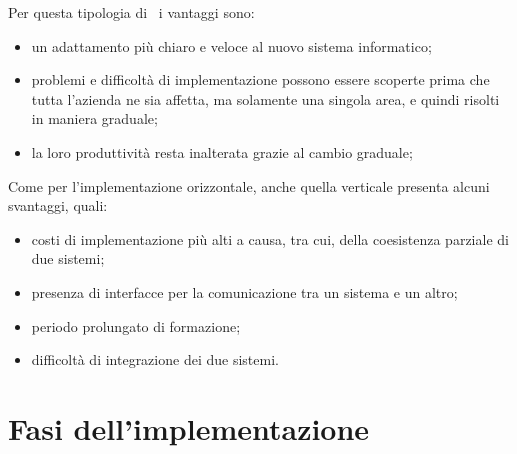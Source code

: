 	Per questa tipologia di \rollout~i vantaggi sono:
	\begin{itemize}[noitemsep]
		\renewcommand\labelitemi{--}
		\item un adattamento più chiaro e veloce al nuovo sistema informatico;
		\item problemi e difficoltà di implementazione possono essere scoperte prima che tutta l'azienda ne sia affetta, ma solamente una singola area, e quindi risolti in maniera graduale;
		\item la loro produttività resta inalterata grazie al cambio graduale;
	\end{itemize}

	Come per l'implementazione orizzontale, anche quella verticale presenta alcuni svantaggi, quali:
	\begin{itemize}[noitemsep]
		\renewcommand\labelitemi{--}
		\item costi di implementazione più alti a causa, tra cui, della coesistenza parziale di due sistemi;
		\item presenza di interfacce per la comunicazione tra un sistema e un altro;
		\item periodo prolungato di formazione;
		\item difficoltà di integrazione dei due sistemi.
	\end{itemize}

\section{Fasi dell'implementazione}

